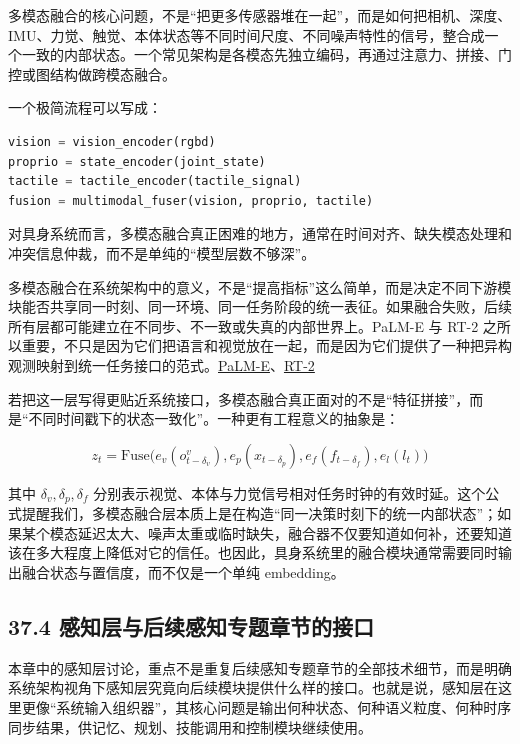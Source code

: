 多模态融合的核心问题，不是“把更多传感器堆在一起”，而是如何把相机、深度、IMU、力觉、触觉、本体状态等不同时间尺度、不同噪声特性的信号，整合成一个一致的内部状态。一个常见架构是各模态先独立编码，再通过注意力、拼接、门控或图结构做跨模态融合。

一个极简流程可以写成：

\begin{lstlisting}[language=python]
vision = vision_encoder(rgbd)
proprio = state_encoder(joint_state)
tactile = tactile_encoder(tactile_signal)
fusion = multimodal_fuser(vision, proprio, tactile)
\end{lstlisting}

对具身系统而言，多模态融合真正困难的地方，通常在时间对齐、缺失模态处理和冲突信息仲裁，而不是单纯的“模型层数不够深”。

多模态融合在系统架构中的意义，不是“提高指标”这么简单，而是决定不同下游模块能否共享同一时刻、同一环境、同一任务阶段的统一表征。如果融合失败，后续所有层都可能建立在不同步、不一致或失真的内部世界上。PaLM-E 与 RT-2 之所以重要，不只是因为它们把语言和视觉放在一起，而是因为它们提供了一种把异构观测映射到统一任务接口的范式。\href{https://arxiv.org/abs/2303.03378}{PaLM-E}、\href{https://arxiv.org/abs/2307.15818}{RT-2}

若把这一层写得更贴近系统接口，多模态融合真正面对的不是“特征拼接”，而是“不同时间戳下的状态一致化”。一种更有工程意义的抽象是：

\begingroup
\scriptsize
\begin{equation*}
z_t = \mathrm{Fuse}\bigl(
e_v(o^v_{t-\delta_v}),
e_p(x_{t-\delta_p}),
e_f(f_{t-\delta_f}),
e_l(l_t)
\bigr)
\end{equation*}
\endgroup

其中 \(\delta_v,\delta_p,\delta_f\) 分别表示视觉、本体与力觉信号相对任务时钟的有效时延。这个公式提醒我们，多模态融合层本质上是在构造“同一决策时刻下的统一内部状态”；如果某个模态延迟太大、噪声太重或临时缺失，融合器不仅要知道如何补，还要知道该在多大程度上降低对它的信任。也因此，具身系统里的融合模块通常需要同时输出融合状态与置信度，而不仅是一个单纯 embedding。

\subsection*{37.4 感知层与后续感知专题章节的接口}


本章中的感知层讨论，重点不是重复后续感知专题章节的全部技术细节，而是明确系统架构视角下感知层究竟向后续模块提供什么样的接口。也就是说，感知层在这里更像“系统输入组织器”，其核心问题是输出何种状态、何种语义粒度、何种时序同步结果，供记忆、规划、技能调用和控制模块继续使用。

